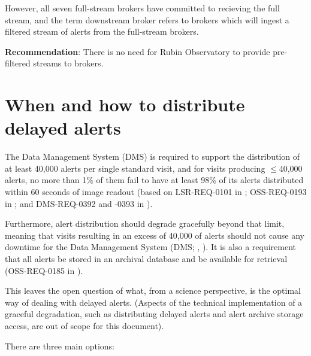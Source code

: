 \documentclass[DM,authoryear,toc]{lsstdoc}
\begin{document}
However, all seven full-stream brokers have committed to recieving the full stream, and the term downstream broker refers to 
brokers which will ingest a filtered stream of alerts from the full-stream brokers.

\textbf{Recommendation}: There is no need for Rubin Observatory to provide pre-filtered streams to brokers.


\section{When and how to distribute delayed alerts}\label{sec:delayed}

The Data Management System (DMS) is required to support the distribution of at least 40,000 alerts per single standard visit, 
and for visits producing $\leq$40,000 alerts, no more than 1\% of them fail to have at least 98\% of its alerts distributed 
within 60 seconds of image readout (based on LSR-REQ-0101 in ; OSS-REQ-0193 in ; 
and DMS-REQ-0392 and -0393 in ).

Furthermore, alert distribution should degrade gracefully beyond that limit, meaning that visits resulting in an excess of 
40,000 of alerts should not cause any downtime for the Data Management System (DMS; , ).
It is also a requirement that all alerts be stored in an archival database and be available for retrieval 
(OSS-REQ-0185 in ).

This leaves the open question of what, from a science perspective, is the optimal way of dealing with delayed alerts.
(Aspects of the technical implementation of a graceful degradation, such as distributing delayed alerts and alert archive 
storage access, are out of scope for this document).

There are three main options:
\end{document}
